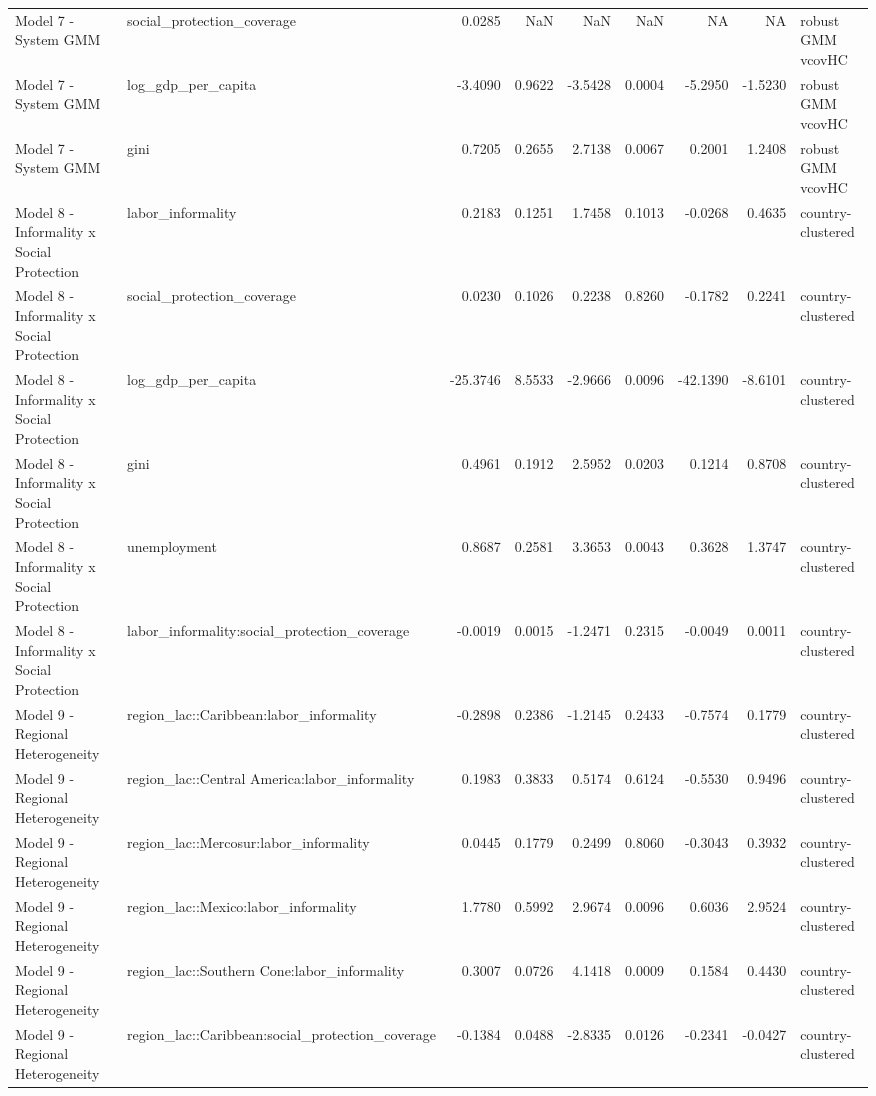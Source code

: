 \begin{tabular}{llrrrrrrl}
Model 7 - System GMM & social\_protection\_coverage & 0.0285 & NaN & NaN & NaN & NA & NA & robust GMM vcovHC\\
\addlinespace
Model 7 - System GMM & log\_gdp\_per\_capita & -3.4090 & 0.9622 & -3.5428 & 0.0004 & -5.2950 & -1.5230 & robust GMM vcovHC\\
Model 7 - System GMM & gini & 0.7205 & 0.2655 & 2.7138 & 0.0067 & 0.2001 & 1.2408 & robust GMM vcovHC\\
Model 8 - Informality x Social Protection & labor\_informality & 0.2183 & 0.1251 & 1.7458 & 0.1013 & -0.0268 & 0.4635 & country-clustered\\
Model 8 - Informality x Social Protection & social\_protection\_coverage & 0.0230 & 0.1026 & 0.2238 & 0.8260 & -0.1782 & 0.2241 & country-clustered\\
Model 8 - Informality x Social Protection & log\_gdp\_per\_capita & -25.3746 & 8.5533 & -2.9666 & 0.0096 & -42.1390 & -8.6101 & country-clustered\\
\addlinespace
Model 8 - Informality x Social Protection & gini & 0.4961 & 0.1912 & 2.5952 & 0.0203 & 0.1214 & 0.8708 & country-clustered\\
Model 8 - Informality x Social Protection & unemployment & 0.8687 & 0.2581 & 3.3653 & 0.0043 & 0.3628 & 1.3747 & country-clustered\\
Model 8 - Informality x Social Protection & labor\_informality:social\_protection\_coverage & -0.0019 & 0.0015 & -1.2471 & 0.2315 & -0.0049 & 0.0011 & country-clustered\\
Model 9 - Regional Heterogeneity & region\_lac::Caribbean:labor\_informality & -0.2898 & 0.2386 & -1.2145 & 0.2433 & -0.7574 & 0.1779 & country-clustered\\
Model 9 - Regional Heterogeneity & region\_lac::Central America:labor\_informality & 0.1983 & 0.3833 & 0.5174 & 0.6124 & -0.5530 & 0.9496 & country-clustered\\
\addlinespace
Model 9 - Regional Heterogeneity & region\_lac::Mercosur:labor\_informality & 0.0445 & 0.1779 & 0.2499 & 0.8060 & -0.3043 & 0.3932 & country-clustered\\
Model 9 - Regional Heterogeneity & region\_lac::Mexico:labor\_informality & 1.7780 & 0.5992 & 2.9674 & 0.0096 & 0.6036 & 2.9524 & country-clustered\\
Model 9 - Regional Heterogeneity & region\_lac::Southern Cone:labor\_informality & 0.3007 & 0.0726 & 4.1418 & 0.0009 & 0.1584 & 0.4430 & country-clustered\\
Model 9 - Regional Heterogeneity & region\_lac::Caribbean:social\_protection\_coverage & -0.1384 & 0.0488 & -2.8335 & 0.0126 & -0.2341 & -0.0427 & country-clustered\\

\end{tabular}
